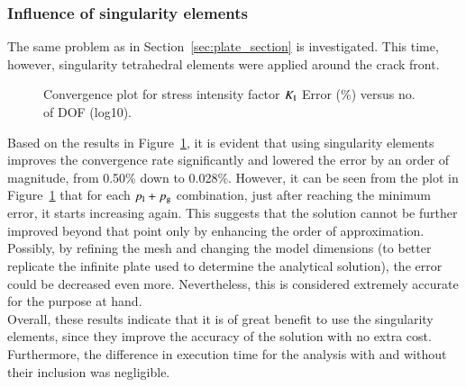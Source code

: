 \documentclass[review]{elsarticle}
\numberwithin{equation}{section}
\begin{document}
\subsubsection{Influence of singularity elements}
\label{sec:quarter_point_results}
The same problem as in Section~\ref{sec:plate_section} is investigated. This time, however, singularity tetrahedral elements were applied around the crack front.
\begin{figure}[h!]
	\centering
	
	
	\caption{Convergence plot for stress intensity factor $K_{\rm I}$ Error (\%) versus no. of DOF (log10).}
	\label{fig:plate_conv_singularity}
\end{figure}
Based on the results in Figure~\ref{fig:plate_conv_singularity}, it is evident that using singularity elements improves the convergence rate significantly and lowered the error by an order of magnitude, from 0.50\% down to 0.028\%. 
However, it can be seen from the plot in Figure~\ref{fig:plate_conv_singularity} that for each $p_{\rm l} + p_{\rm g}$ combination, just after reaching the minimum error, it starts increasing again. 
This suggests that the solution cannot be further improved beyond that point only by enhancing the order of approximation. 
Possibly, by refining the mesh and changing the model dimensions (to better replicate the infinite plate used to determine the analytical solution), the error could be decreased even more. 
Nevertheless, this is considered extremely accurate for the purpose at hand. \\
Overall, these results indicate that it is of great benefit to use the singularity elements, since they improve the accuracy of the solution with no extra cost.
Furthermore, the difference in execution time for the analysis with and without their inclusion was negligible. 
\end{document}
